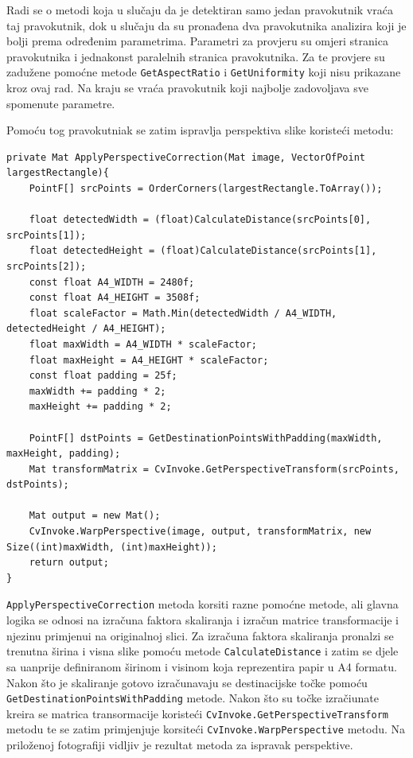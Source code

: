 \documentclass{foi}
\begin{document}
Radi se o metodi koja u slučaju da je detektiran samo jedan pravokutnik vraća taj pravokutnik, dok u slučaju da su pronađena dva pravokutnika analizira koji je bolji prema određenim parametrima. Parametri za provjeru su omjeri stranica pravokutnika i jednakonst paralelnih stranica pravokutnika. Za te provjere su zadužene pomoćne metode \texttt{GetAspectRatio} i \texttt{GetUniformity} koji nisu prikazane kroz ovaj rad. Na kraju se vraća pravokutnik koji najbolje zadovoljava sve spomenute parametre.

\pagebreak
Pomoću tog pravokutniak se zatim ispravlja perspektiva slike koristeći metodu:
\begin{lstlisting}[caption={Metoda za odabir najboljeg pravokutnika}]
private Mat ApplyPerspectiveCorrection(Mat image, VectorOfPoint largestRectangle){
    PointF[] srcPoints = OrderCorners(largestRectangle.ToArray());

    float detectedWidth = (float)CalculateDistance(srcPoints[0], srcPoints[1]);
    float detectedHeight = (float)CalculateDistance(srcPoints[1], srcPoints[2]);
    const float A4_WIDTH = 2480f;
    const float A4_HEIGHT = 3508f;
    float scaleFactor = Math.Min(detectedWidth / A4_WIDTH, detectedHeight / A4_HEIGHT);
    float maxWidth = A4_WIDTH * scaleFactor;
    float maxHeight = A4_HEIGHT * scaleFactor;
    const float padding = 25f;
    maxWidth += padding * 2;
    maxHeight += padding * 2;

    PointF[] dstPoints = GetDestinationPointsWithPadding(maxWidth, maxHeight, padding);
    Mat transformMatrix = CvInvoke.GetPerspectiveTransform(srcPoints, dstPoints);

    Mat output = new Mat();
    CvInvoke.WarpPerspective(image, output, transformMatrix, new Size((int)maxWidth, (int)maxHeight));
    return output;
}
\end{lstlisting}

\texttt{ApplyPerspectiveCorrection} metoda korsiti razne pomoćne metode, ali glavna logika se odnosi na izračuna faktora skaliranja i izračun matrice transformacije i njezinu primjenui na originalnoj slici. Za izračuna faktora skaliranja pronalzi se trenutna širina i visna slike pomoću metode \texttt{CalculateDistance} i zatim se djele sa uanprije definiranom širinom i visinom koja reprezentira papir u A4 formatu. Nakon što  je skaliranje gotovo izračunavaju se destinacijske točke pomoću \texttt{GetDestinationPointsWithPadding} metode. Nakon što su točke izračiunate kreira se matrica transormacije koristeći \texttt{CvInvoke.GetPerspectiveTransform} metodu te se zatim primjenjuje korsiteći \texttt{CvInvoke.WarpPerspective} metodu. Na priloženoj fotografiji vidljiv je rezultat metoda za ispravak perspektive.
\end{document}
